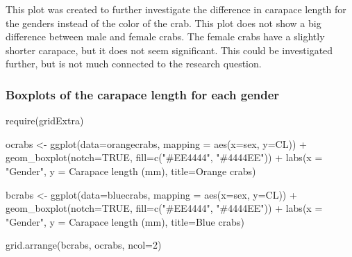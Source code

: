 \documentclass[
]{article}
\newenvironment{Shaded}{}{}
\newcommand{\AttributeTok}[1]{#1}
\newcommand{\ConstantTok}[1]{#1}
\newcommand{\DecValTok}[1]{#1}
\newcommand{\FunctionTok}[1]{#1}
\newcommand{\NormalTok}[1]{#1}
\newcommand{\OtherTok}[1]{\textcolor[rgb]{1.00,0.25,0.00}{#1}}
\newcommand{\SpecialCharTok}[1]{\textcolor[rgb]{0.00,0.50,0.50}{#1}}
\newcommand{\StringTok}[1]{\textcolor[rgb]{0.00,0.50,0.50}{#1}}
\begin{document}
This plot was created to further investigate the difference in carapace
length for the genders instead of the color of the crab. This plot does
not show a big difference between male and female crabs. The female
crabs have a slightly shorter carapace, but it does not seem
significant. This could be investigated further, but is not much
connected to the research question. \newpage

\hypertarget{boxplots-of-the-carapace-length-for-each-gender}{%
\subsubsection{Boxplots of the carapace length for each
gender}\label{boxplots-of-the-carapace-length-for-each-gender}}

\begin{Shaded}
\begin{Highlighting}[]
\FunctionTok{require}\NormalTok{(gridExtra)}

\NormalTok{ocrabs }\OtherTok{\textless{}{-}} \FunctionTok{ggplot}\NormalTok{(}\AttributeTok{data=}\NormalTok{orangecrabs, }\AttributeTok{mapping =} \FunctionTok{aes}\NormalTok{(}\AttributeTok{x=}\NormalTok{sex, }\AttributeTok{y=}\NormalTok{CL)) }\SpecialCharTok{+}
  \FunctionTok{geom\_boxplot}\NormalTok{(}\AttributeTok{notch=}\ConstantTok{TRUE}\NormalTok{, }\AttributeTok{fill=}\FunctionTok{c}\NormalTok{(}\StringTok{"\#EE4444"}\NormalTok{, }\StringTok{"\#4444EE"}\NormalTok{)) }\SpecialCharTok{+}
  \FunctionTok{labs}\NormalTok{(}\AttributeTok{x =} \StringTok{"Gender"}\NormalTok{, }\AttributeTok{y =} \StringTok{\textquotesingle{}Carapace length (mm)\textquotesingle{}}\NormalTok{, }\AttributeTok{title=}\StringTok{\textquotesingle{}Orange crabs\textquotesingle{}}\NormalTok{)}

\NormalTok{bcrabs }\OtherTok{\textless{}{-}} \FunctionTok{ggplot}\NormalTok{(}\AttributeTok{data=}\NormalTok{bluecrabs, }\AttributeTok{mapping =} \FunctionTok{aes}\NormalTok{(}\AttributeTok{x=}\NormalTok{sex, }\AttributeTok{y=}\NormalTok{CL)) }\SpecialCharTok{+}
  \FunctionTok{geom\_boxplot}\NormalTok{(}\AttributeTok{notch=}\ConstantTok{TRUE}\NormalTok{, }\AttributeTok{fill=}\FunctionTok{c}\NormalTok{(}\StringTok{"\#EE4444"}\NormalTok{, }\StringTok{"\#4444EE"}\NormalTok{)) }\SpecialCharTok{+}
  \FunctionTok{labs}\NormalTok{(}\AttributeTok{x =} \StringTok{"Gender"}\NormalTok{, }\AttributeTok{y =} \StringTok{\textquotesingle{}Carapace length (mm)\textquotesingle{}}\NormalTok{, }\AttributeTok{title=}\StringTok{\textquotesingle{}Blue crabs\textquotesingle{}}\NormalTok{)}

\FunctionTok{grid.arrange}\NormalTok{(bcrabs, ocrabs, }\AttributeTok{ncol=}\DecValTok{2}\NormalTok{)}
\end{Highlighting}
\end{Shaded}
\end{document}
